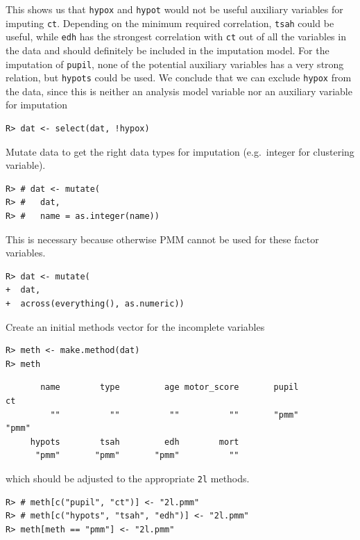 \documentclass[
  article]{jss}
\begin{document}
This shows us that \texttt{hypox} and \texttt{hypot} would not be useful
auxiliary variables for imputing \texttt{ct}. Depending on the minimum
required correlation, \texttt{tsah} could be useful, while \texttt{edh}
has the strongest correlation with \texttt{ct} out of all the variables
in the data and should definitely be included in the imputation model.
For the imputation of \texttt{pupil}, none of the potential auxiliary
variables has a very strong relation, but \texttt{hypots} could be used.
We conclude that we can exclude \texttt{hypox} from the data, since this
is neither an analysis model variable nor an auxiliary variable for
imputation

\begin{verbatim}
R> dat <- select(dat, !hypox)
\end{verbatim}

Mutate data to get the right data types for imputation (e.g.~integer for
clustering variable).

\begin{verbatim}
R> # dat <- mutate(
R> #   dat,
R> #   name = as.integer(name))
\end{verbatim}

This is necessary because otherwise PMM cannot be used for these factor
variables.

\begin{verbatim}
R> dat <- mutate(
+  dat,
+  across(everything(), as.numeric))
\end{verbatim}

Create an initial methods vector for the incomplete variables

\begin{verbatim}
R> meth <- make.method(dat)
R> meth
\end{verbatim}

\begin{verbatim}
       name        type         age motor_score       pupil          ct 
         ""          ""          ""          ""       "pmm"       "pmm" 
     hypots        tsah         edh        mort 
      "pmm"       "pmm"       "pmm"          "" 
\end{verbatim}

which should be adjusted to the appropriate \texttt{2l} methods.

\begin{verbatim}
R> # meth[c("pupil", "ct")] <- "2l.pmm"
R> # meth[c("hypots", "tsah", "edh")] <- "2l.pmm"
R> meth[meth == "pmm"] <- "2l.pmm"
\end{verbatim}
\end{document}
